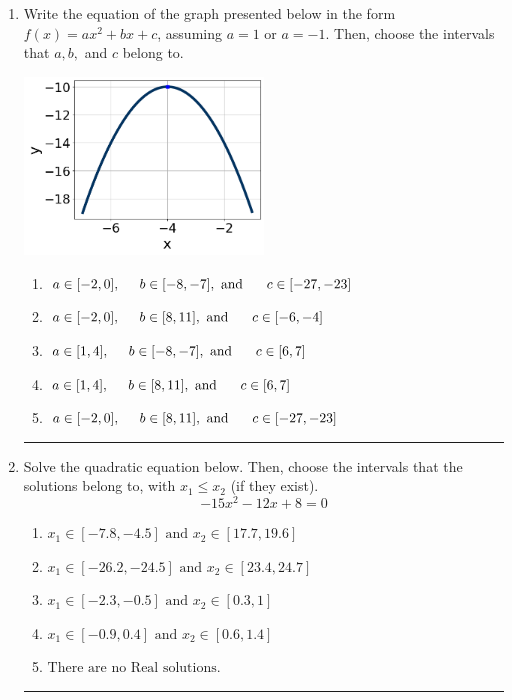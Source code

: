 \documentclass[14pt]{extbook}
\newcommand{\litem}[1]{\item#1\hspace*{-1cm}\rule{\textwidth}{0.4pt}}
\begin{document}
\begin{enumerate}
{\begin{enumerate}[label=\Alph*.]
\end{enumerate} }
\litem{
Write the equation of the graph presented below in the form $f(x)=ax^2+bx+c$, assuming  $a=1$ or $a=-1$. Then, choose the intervals that $a, b,$ and $c$ belong to.
\begin{center}
    \includegraphics[width=0.5\textwidth]{../Figures/quadraticGraphToEquationCopyB.png}
\end{center}
\begin{enumerate}[label=\Alph*.]
\item \( a \in [-2, 0], \hspace*{5mm} b \in [-8, -7], \text{ and } \hspace*{5mm} c \in [-27, -23] \)
\item \( a \in [-2, 0], \hspace*{5mm} b \in [8, 11], \text{ and } \hspace*{5mm} c \in [-6, -4] \)
\item \( a \in [1, 4], \hspace*{5mm} b \in [-8, -7], \text{ and } \hspace*{5mm} c \in [6, 7] \)
\item \( a \in [1, 4], \hspace*{5mm} b \in [8, 11], \text{ and } \hspace*{5mm} c \in [6, 7] \)
\item \( a \in [-2, 0], \hspace*{5mm} b \in [8, 11], \text{ and } \hspace*{5mm} c \in [-27, -23] \)

\end{enumerate} }
\litem{
Solve the quadratic equation below. Then, choose the intervals that the solutions belong to, with $x_1 \leq x_2$ (if they exist).\[ -15x^{2} -12 x + 8 = 0 \]\begin{enumerate}[label=\Alph*.]
\item \( x_1 \in [-7.8, -4.5] \text{ and } x_2 \in [17.7, 19.6] \)
\item \( x_1 \in [-26.2, -24.5] \text{ and } x_2 \in [23.4, 24.7] \)
\item \( x_1 \in [-2.3, -0.5] \text{ and } x_2 \in [0.3, 1] \)
\item \( x_1 \in [-0.9, 0.4] \text{ and } x_2 \in [0.6, 1.4] \)
\item \( \text{There are no Real solutions.} \)


\end{enumerate}}
\end{enumerate}
\end{document}
